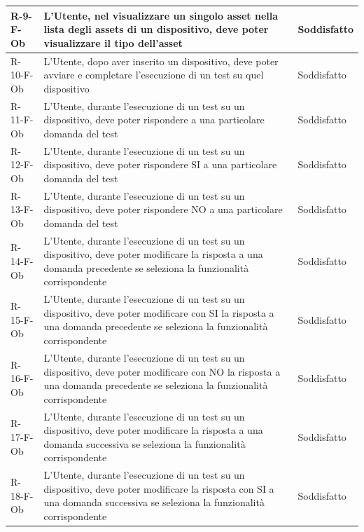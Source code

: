 \documentclass[a4paper,12pt]{article}
\begin{document}
{{\begin{longtable}{|l|p{}|p{}|}
                R-9-F-Ob        & L'Utente, nel visualizzare un singolo asset nella lista degli assets di un dispositivo, deve poter visualizzare il tipo dell'asset                                                          & Soddisfatto \\ \hline
                R-10-F-Ob       & L'Utente, dopo aver inserito un dispositivo, deve poter avviare e completare l'esecuzione di un test su quel dispositivo                                                                    & Soddisfatto \\ \hline
                R-11-F-Ob       & L'Utente, durante l'esecuzione di un test su un dispositivo, deve poter rispondere a una particolare domanda del test                                                                       & Soddisfatto \\ \hline
                R-12-F-Ob       & L'Utente, durante l'esecuzione di un test su un dispositivo, deve poter rispondere SI a una particolare domanda del test                                                                       & Soddisfatto \\ \hline
                R-13-F-Ob       & L'Utente, durante l'esecuzione di un test su un dispositivo, deve poter rispondere NO a una particolare domanda del test                                                                       & Soddisfatto \\ \hline
                R-14-F-Ob       & L'Utente, durante l'esecuzione di un test su un dispositivo, deve poter modificare la risposta a una domanda precedente se seleziona la funzionalità corrispondente                         & Soddisfatto \\ \hline
                R-15-F-Ob       & L'Utente, durante l'esecuzione di un test su un dispositivo, deve poter modificare con SI la risposta a una domanda precedente se seleziona la funzionalità corrispondente                         & Soddisfatto \\ \hline
                R-16-F-Ob       & L'Utente, durante l'esecuzione di un test su un dispositivo, deve poter modificare con NO la risposta a una domanda precedente se seleziona la funzionalità corrispondente                         & Soddisfatto \\ \hline
                R-17-F-Ob       & L'Utente, durante l'esecuzione di un test su un dispositivo, deve poter modificare la risposta a una domanda successiva se seleziona la funzionalità corrispondente                         & Soddisfatto \\ \hline
                R-18-F-Ob       & L'Utente, durante l'esecuzione di un test su un dispositivo, deve poter modificare la risposta con SI a una domanda successiva se seleziona la funzionalità corrispondente                         & Soddisfatto \\ \hline

\end{longtable}}}
\end{document}
